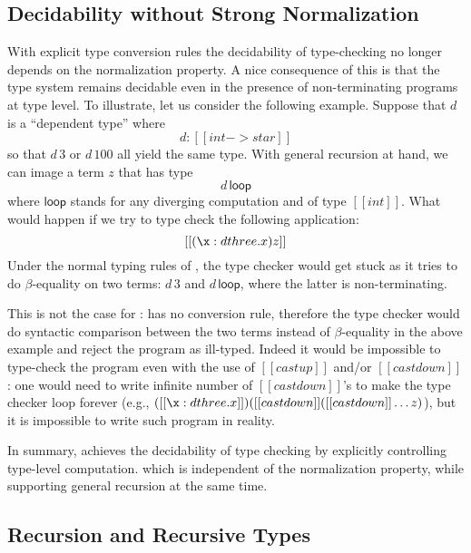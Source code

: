 \subsection{Decidability without Strong Normalization}

With explicit type conversion rules the decidability of type-checking 
no longer depends on the normalization property. 
A nice consequence of this is that the type system remains decidable
even in the presence of non-terminating programs at type level.
To illustrate, let us consider the following example. Suppose that $d$ is a ``dependent type'' where
\[d : [[int -> star]]\] so that $d\,3$ or $d\,100$ all yield the same
type. With general recursion at hand, we can image a term $z$ that has
type \[d\,\mathsf{loop}\] where $\mathsf{loop}$ stands for any
diverging computation and of type $[[int]]$. What would happen if we
try to type check the following application: \[ [[(\x: d three.x)z]]\]
Under the normal typing rules of \coc, the type checker would get
stuck as it tries to do $\beta$-equality on two terms: $d\,3$ and
$d\,\mathsf{loop}$, where the latter is non-terminating.

This is not the case for \name: \name has no conversion rule,
therefore the type checker would do syntactic comparison between the
two terms instead of $\beta$-equality in the above example and reject
the program as ill-typed. Indeed it would be impossible to type-check
the program even with the use of $[[castup]]$ and/or $[[castdown]]$:
one would need to write infinite number of $[[castdown]]$'s to make
the type checker loop forever (e.g., $([[\x:d
three.x]])([[castdown]]([[castdown]] \dots z) $), but it is impossible
to write such program in reality.

In summary, \name achieves the decidability of type checking by
explicitly controlling type-level computation.  which is independent of
the normalization property, while supporting general recursion at the
same time.

\subsection{Recursion and Recursive Types}
\label{sec:overview:recursion}


